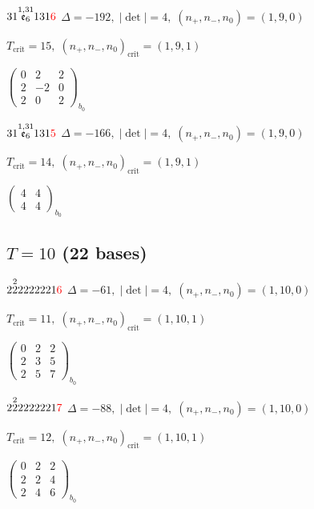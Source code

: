 \documentclass[10pt]{article}
\begin{document}
$31\overset{1,31}{\mathfrak{e}_6}131\textcolor{red}{6}$ \quad $\Delta=-192,\; |\det|=4,\; (n_+,n_-,n_0)=(1,9,0)$

\hspace{1em}$T_{\text{crit}}=15,\; (n_+,n_-,n_0)_{\text{crit}}=(1,9,1)$

\hspace{2em}$\left(\begin{smallmatrix}0 & 2 & 2 \\ 2 & -2 & 0 \\ 2 & 0 & 2\end{smallmatrix}\right)_{\!b_0}$

$31\overset{1,31}{\mathfrak{e}_6}131\textcolor{red}{5}$ \quad $\Delta=-166,\; |\det|=4,\; (n_+,n_-,n_0)=(1,9,0)$

\hspace{1em}$T_{\text{crit}}=14,\; (n_+,n_-,n_0)_{\text{crit}}=(1,9,1)$

\hspace{2em}$\left(\begin{smallmatrix}4 & 4 \\ 4 & 4\end{smallmatrix}\right)_{\!b_0}$


\subsection*{$T = 10$ \quad (22 bases)}
\smallskip

$2\overset{2}{2}2222221\textcolor{red}{6}$ \quad $\Delta=-61,\; |\det|=4,\; (n_+,n_-,n_0)=(1,10,0)$

\hspace{1em}$T_{\text{crit}}=11,\; (n_+,n_-,n_0)_{\text{crit}}=(1,10,1)$

\hspace{2em}$\left(\begin{smallmatrix}0 & 2 & 2 \\ 2 & 3 & 5 \\ 2 & 5 & 7\end{smallmatrix}\right)_{\!b_0}$

$2\overset{2}{2}2222221\textcolor{red}{7}$ \quad $\Delta=-88,\; |\det|=4,\; (n_+,n_-,n_0)=(1,10,0)$

\hspace{1em}$T_{\text{crit}}=12,\; (n_+,n_-,n_0)_{\text{crit}}=(1,10,1)$

\hspace{2em}$\left(\begin{smallmatrix}0 & 2 & 2 \\ 2 & 2 & 4 \\ 2 & 4 & 6\end{smallmatrix}\right)_{\!b_0}$
\end{document}
